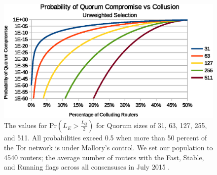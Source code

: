 \documentclass[USenglish,oneside,twocolumn]{article}
\begin{document}
%
%
%
%


\begin{figure}[h]
	\centering
	\includegraphics[width=\linewidth]{../assets/analysis/QuorumSelectionUnweighted.eps}
	\caption{The values for $ \mathrm{Pr}(L_{E} > \frac{L_{Q}}{2}) $ for Quorum sizes of 31, 63, 127, 255, and 511. All probabilities exceed 0.5 when more than 50 percent of the Tor network is under Mallory's control. We set our population to 4540 routers; the average number of routers with the Fast, Stable, and Running flags across all consensuses in July 2015 \cite{TorMetrics}.}
	\label{fig:quorumUnweightedMajority}
\end{figure}
\end{document}
